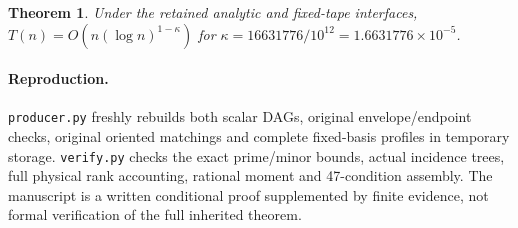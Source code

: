 \documentclass[11pt]{article}
\newtheorem{theorem}{Theorem}
\begin{document}
\begin{theorem}
Under the retained analytic and fixed-tape interfaces,
$T(n)=O(n(\log n)^{1-\kappa})$ for
$\kappa=16631776/10^{12}=1.6631776\times10^{-5}$.
\end{theorem}
\paragraph{Reproduction.}
\texttt{producer.py} freshly rebuilds both scalar DAGs,
original envelope/endpoint checks, original oriented matchings and complete
fixed-basis profiles in temporary storage. \texttt{verify.py}
checks the exact prime/minor bounds, actual incidence trees, full physical
rank accounting, rational moment and 47-condition assembly. The manuscript
is a written conditional proof supplemented by finite evidence, not formal
verification of the full inherited theorem.
\end{document}
